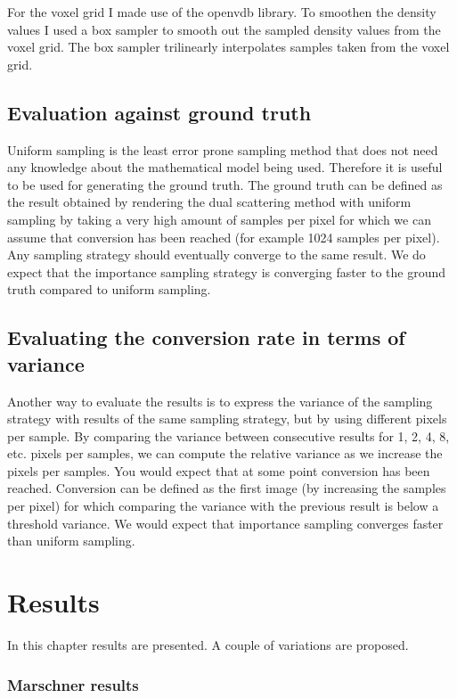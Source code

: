 \documentclass[11pt,a4paper]{report}
\begin{document}
For the voxel grid I made use of the openvdb library. To smoothen the density values I used a box sampler to smooth out the sampled density values from the voxel grid. The box sampler trilinearly interpolates samples taken from the voxel grid.

\section{Evaluation against ground truth}

Uniform sampling is the least error prone sampling method that does not need any knowledge about the mathematical model being used. Therefore it is useful to be used for generating the ground truth. The ground truth can be defined as the result obtained by rendering the dual scattering method with uniform sampling by taking a very high amount of samples per pixel for which we can assume that conversion has been reached (for example 1024 samples per pixel).  Any sampling strategy should eventually converge to the same result. We do expect that the importance sampling strategy is converging faster to the ground truth compared to uniform sampling.


\section{Evaluating the conversion rate in terms of variance}

Another way to evaluate the results is to express the variance of the sampling strategy with results of the same sampling strategy, but by using different pixels per sample. By comparing the variance between consecutive results for 1, 2, 4, 8, etc. pixels per samples, we can compute the relative variance as we increase the pixels per samples. You would expect that at some point conversion has been reached. Conversion can be defined as the first image (by increasing the samples per pixel) for which comparing the variance with the previous result is below a threshold variance. We would expect that importance sampling converges faster than uniform sampling.


\chapter{Results}

In this chapter results are presented. A couple of variations are proposed.

\subsection{Marschner results}
\end{document}
